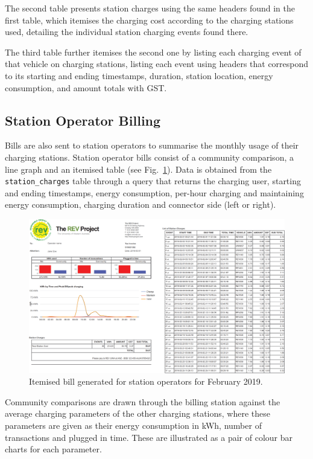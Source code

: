 
The second table presents station charges using the same headers found in the first table, which itemises the charging cost according to the charging stations used, detailing the individual station charging events found there. 

The third table further itemises the second one by listing each charging event of that vehicle on charging stations, listing each event using headers that correspond to its starting and ending timestamps, duration, station location, energy consumption, and amount totals with GST.

\subsection{Station Operator Billing}
Bills are also sent to station operators to summarise the monthly usage of their charging stations. Station operator bills consist of a community comparison, a line graph and an itemised table (see Fig.~\ref{fig:9:sob}). Data is obtained from the \texttt{station\_charges} table through a query that returns the charging user, starting and ending timestamps, energy consumption, per-hour charging and maintaining energy consumption, charging duration and connector side (left or right). 

\begin{figure}[H]
	\centering
	\includegraphics[width=\linewidth]{bill-station_1_crop}
	\caption{Itemised bill generated for station operators for February 2019.}
	\label{fig:9:sob}
\end{figure}

Community comparisons are drawn through the billing station against the average charging parameters of the other charging stations, where these parameters are given as their energy consumption in kWh, number of transactions and plugged in time. These are illustrated as a pair of colour bar charts for each parameter.

